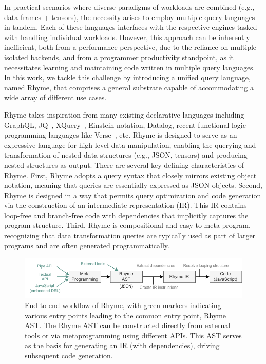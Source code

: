 \documentclass[runningheads]{llncs}
\newcommand{\lang}{Rhyme}
\begin{document}
In practical scenarios where diverse paradigms of workloads are combined
(e.g., data frames + tensors), the necessity arises to employ multiple
query languages in tandem.
Each of these languages interfaces with the respective engines tasked
with handling individual workloads.
However, this approach can be inherently inefficient, both from a performance
perspective, due to the reliance on multiple isolated backends, and from
a programmer productivity standpoint, as it necessitates learning and
maintaining code written in multiple query languages.
In this work, we tackle this challenge by introducing a unified query language, 
named \lang{},
that comprises a general substrate capable of accommodating a wide array of
different use cases.

\lang{} takes inspiration from many existing declarative languages
including GraphQL, JQ~\cite{jq}, XQuery~\cite{xquery}, Einstein notation,
Datalog, recent functional logic programming languages like Verse~\cite{verse}, etc.
\lang{} is designed to serve as an expressive language for high-level data
manipulation, enabling the querying and transformation of nested data structures
(e.g., JSON, tensors)
and producing nested structures as output.
There are several key defining characteristics of \lang{}.
First, \lang{} adopts a query syntax that closely mirrors existing object notation,
meaning that queries are essentially expressed as JSON objects.
Second, \lang{} is designed in a way that permits query optimization and
code generation via the construction of an intermediate representation (IR).
This IR contains loop-free and branch-free code with dependencies that implicitly
captures the program structure.
Third, \lang{} is compositional and easy to meta-program, recognizing that data
transformation queries are typically used as part of larger programs and are often
generated programmatically.

\begin{figure}[t!]
\includegraphics[width=\textwidth]{images/intro_fig.pdf}
\caption{
End-to-end workflow of \lang{}, with green markers indicating various entry points
leading to the common entry point, \lang{} AST.
The \lang{} AST can be constructed directly from external tools or via metaprogramming
using different APIs.
This AST serves as the basis for generating an IR (with dependencies), driving
subsequent code generation.
}\label{fig:intro_overview}
\end{figure}
\end{document}
